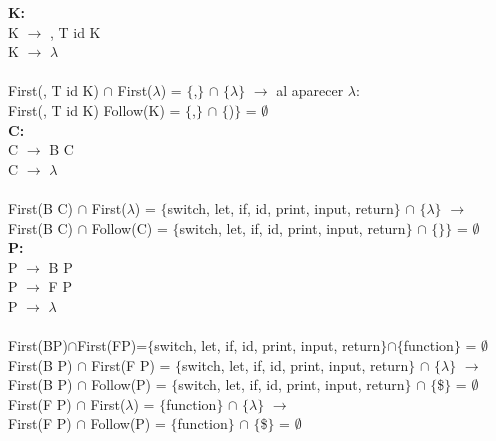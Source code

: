 \documentclass{article}[a4paper]
\newcommand\tab[1][1cm]{\hspace*{#1}}
\begin{document}
\textbf{K:}\\
\tab K $\rightarrow$ , T id K\\
\tab K $\rightarrow$ $\lambda$\\ \\
\tab \tab First(, T id K) $\cap$ First($\lambda$) = $\lbrace$,$\rbrace$ $\cap$ $\lbrace$$\lambda$$\rbrace$ $\rightarrow$ al aparecer $\lambda$:\\
\tab \tab First(, T id K) \cap  Follow(K) = $\lbrace$,$\rbrace$ $\cap$ $\lbrace$)$\rbrace$ = $\emptyset$\\

\textbf{C:}\\
\tab C $\rightarrow$ B C\\
\tab C $\rightarrow$ $\lambda$\\ \\
\tab \tab First(B C) $\cap$ First($\lambda$) = $\lbrace$switch, let, if, id, print, input, return$\rbrace$ $\cap$ $\lbrace$$\lambda$$\rbrace$ $\rightarrow$\\
\tab \tab First(B C) $\cap$  Follow(C) = $\lbrace$switch, let, if, id, print, input, return$\rbrace$ $\cap$ $\lbrace$$\rbrace$$\rbrace$ = $\emptyset$\\

\textbf{P:}\\
\tab P $\rightarrow$ B P\\
\tab P $\rightarrow$ F P\\
\tab P $\rightarrow$ $\lambda$\\ \\
\tab \tab First(BP)$\cap$First(FP)=$\lbrace$switch, let, if, id, print, input, return$\rbrace$$\cap$$\lbrace$function$\rbrace$ = $\emptyset$\\
\tab \tab First(B P) $\cap$ First(F P) = $\lbrace$switch, let, if, id, print, input, return$\rbrace$ $\cap$ $\lbrace$$\lambda$$\rbrace$ $\rightarrow$\\
\tab \tab First(B P) $\cap$ Follow(P) = $\lbrace$switch, let, if, id, print, input, return$\rbrace$ $\cap$ $\lbrace$\$$\rbrace$ = $\emptyset$\\
\tab \tab First(F P) $\cap$ First($\lambda$) = $\lbrace$function$\rbrace$ $\cap$ $\lbrace$$\lambda$$\rbrace$ $\rightarrow$\\
\tab \tab First(F P) $\cap$ Follow(P) = $\lbrace$function$\rbrace$ $\cap$ $\lbrace$\$$\rbrace$ = $\emptyset$\\
\end{document}
